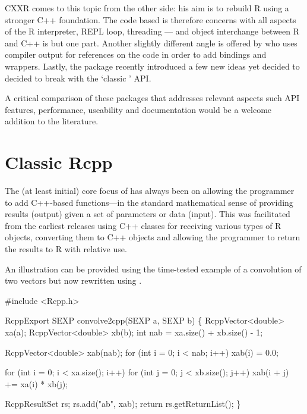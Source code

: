 CXXR \citep{runnalls09:cxxr} comes to this topic from the other side: his aim
is to rebuild R using a stronger C++ foundation. 
The code based is therefore concerns with all aspects of the R interpreter,
REPL loop, threading --- and object interchange between R and C++ is but one part.
%
Another slightly different angle is offered by
\cite{templelang09:rgcctranslationunit} who uses compiler output for
references on the code in order to add bindings and wrappers.
%
Lastly, the  package \citep{samperi09:rcpptemplate}
recently introduced a few new ideas yet decided to decided to break with the
`classic ' API.

A critical comparison of these packages that addresses relevant aspects such
API features, performance, useability and documentation would be a welcome
addition to the literature.


\section{Classic Rcpp}
\label{sec:classic_rcpp}

The (at least initial) core focus of  has always been on allowing
the programmer to add C++-based functions---in the standard mathematical
sense of providing results (output) given a set of parameters or data
(input). This was facilitated from the earliest releases using C++ classes
for receiving various types of R objects, converting them to C++ objects and
allowing the programmer to return the results to R with relative use.

An illustration can be provided using the time-tested example of a
convolution of two vectors \citep{R:exts} but now rewritten using .

\begin{example}
#include <Rcpp.h>

RcppExport SEXP convolve2cpp(SEXP a, SEXP b) \{
  RcppVector<double> xa(a);
  RcppVector<double> xb(b);
  int nab = xa.size() + xb.size() - 1;

  RcppVector<double> xab(nab);
  for (int i = 0; i < nab; i++) xab(i) = 0.0;

  for (int i = 0; i < xa.size(); i++)
    for (int j = 0; j < xb.size(); j++) 
       xab(i + j) += xa(i) * xb(j);

  RcppResultSet rs;
  rs.add("ab", xab);
  return rs.getReturnList();
\}
\end{example}

